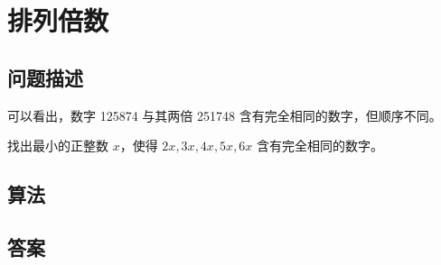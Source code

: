\section{排列倍数}
\subsection{问题描述}
\begin{tcolorbox}
可以看出，数字 125874 与其两倍 251748 含有完全相同的数字，但顺序不同。

找出最小的正整数 $x$，使得 $2x, 3x, 4x, 5x, 6x$ 含有完全相同的数字。
\end{tcolorbox}

\subsection{算法}


\subsection{答案}
